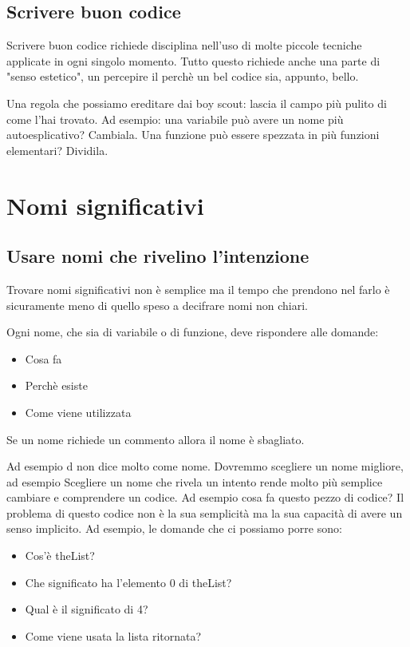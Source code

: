 \documentclass[11pt,a4paper]{book}
\begin{document}
\section{Scrivere buon codice}
Scrivere buon codice richiede disciplina nell'uso di molte piccole tecniche applicate in ogni singolo momento. Tutto questo richiede anche una parte di "senso estetico", un percepire il perchè un bel codice sia, appunto, bello.

Una regola che possiamo ereditare dai boy scout: lascia il campo più pulito di come l'hai trovato. Ad esempio: una variabile può avere un nome più autoesplicativo? Cambiala. Una funzione può essere spezzata in più funzioni elementari? Dividila.

\chapter{Nomi significativi}
\section{Usare nomi che rivelino l'intenzione}
Trovare nomi significativi non è semplice ma il tempo che prendono nel farlo è sicuramente meno di quello speso a decifrare nomi non chiari.

Ogni nome, che sia di variabile o di funzione, deve rispondere alle domande:
\begin{itemize}
	\item[] Cosa fa
	\item[] Perchè esiste
	\item[] Come viene utilizzata
\end{itemize}
Se un nome richiede un commento allora il nome è sbagliato.

Ad esempio
\label{code: 001}
d non dice molto come nome. Dovremmo scegliere un nome migliore, ad esempio
\label{code: 002}
Scegliere un nome che rivela un intento rende molto più semplice cambiare e comprendere un codice. Ad esempio cosa fa questo pezzo di codice?
\label{code: 003}
Il problema di questo codice non è la sua semplicità ma la sua capacità di avere un senso implicito. Ad esempio, le domande che ci possiamo porre sono:
\begin{itemize}
	\item[] Cos'è theList?
	\item[] Che significato ha l'elemento 0 di theList?
	\item[] Qual è il significato di 4?
	\item[] Come viene usata la lista ritornata?
\end{itemize}
\end{document}
